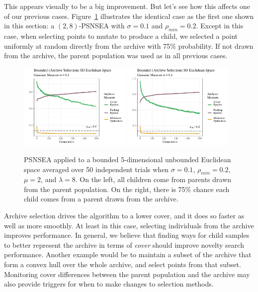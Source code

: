 \documentclass[twoside]{article}
\begin{document}
This appears visually to be a big improvement.  But let's see how this affects one of our previous cases.  Figure~\ref{fig:bounded:viz:mu2lam8:0102} illustrates the identical case as the first one shown in this section:  a $(2,8)$-PSNSEA with $\sigma=0.1$ and $\rho_{min}=0.2$.  Except in this case, when selecting points to mutate to produce a child, we selected a point uniformly at random directly from the archive with 75\% probability.  If not drawn from the archive, the parent population was used as in all previous cases.
%
\begin{figure}[h]
  \includegraphics[width=0.48\textwidth]{Figures/bounded-500-s01r02-mu2lam8.pdf}
  \includegraphics[width=0.48\textwidth]{Figures/boundedrv-500-vizexamp-mu2lam8-full.pdf}
  \caption{\label{fig:bounded:viz:mu2lam8:0102} PSNSEA applied to a bounded 5-dimensional unbounded Euclidean space averaged over 50 independent trials when $\sigma=0.1$, $\rho_{min}=0.2$, $\mu=2$, and $\lambda=8$.  On the left, all children come from parents drawn from the parent population.  On the right, there is 75\% chance each child comes from a parent drawn from the archive.}
\end{figure}

Archive selection drives the algorithm to a lower cover, and it does so faster as well as more smoothly.  At least in this case, selecting individuals from the archive improves performance.  In general, we believe that finding ways for child samples to better represent the archive in terms of \emph{cover} should improve novelty search performance.  Another example would be to maintain a subset of the archive that form a convex hull over the whole archive, and select points from that subset.  Monitoring cover differences between the parent population and the archive may also provide triggers for when to make changes to selection methods.
\end{document}
